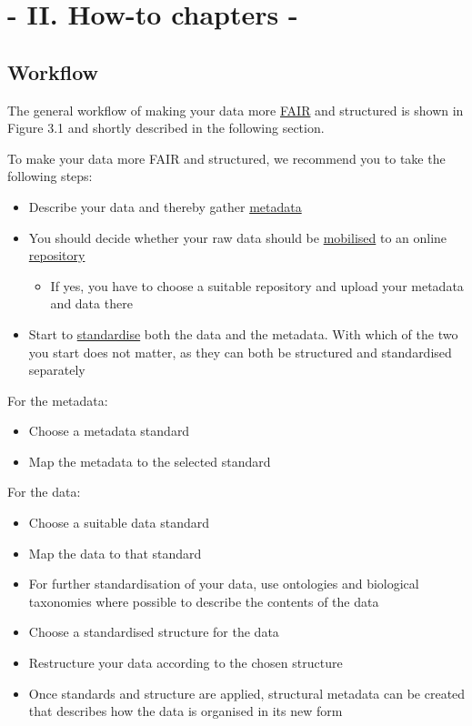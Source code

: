 \documentclass[
  oneside]{book}
\providecommand{\tightlist}{%
  \setlength{\itemsep}{0pt}\setlength{\parskip}{0pt}}
\begin{document}
\part*{- II. How-to chapters -}\label{part---ii.-how-to-chapters--}

\chapter{Workflow}\label{workflow}

The general workflow of making your data more \hyperref[FAIR]{FAIR} and structured is shown in Figure 3.1 and shortly described in the following section.

To make your data more FAIR and structured, we recommend you to take the following steps:

\begin{itemize}
\item
  Describe your data and thereby gather \hyperref[metadata]{metadata}
\item
  You should decide whether your raw data should be \hyperref[mobilisation]{mobilised} to an online \hyperref[repository]{repository}

  \begin{itemize}
  \tightlist
  \item
    If yes, you have to choose a suitable repository and upload your metadata and data there
  \end{itemize}
\item
  Start to \hyperref[standardise]{standardise} both the data and the metadata. With which of the two you start does not matter, as they can both be structured and standardised separately
\end{itemize}

For the metadata:

\begin{itemize}
\item
  Choose a metadata standard
\item
  Map the metadata to the selected standard
\end{itemize}

For the data:

\begin{itemize}
\item
  Choose a suitable data standard
\item
  Map the data to that standard
\item
  For further standardisation of your data, use ontologies and biological taxonomies where possible to describe the contents of the data
\item
  Choose a standardised structure for the data
\item
  Restructure your data according to the chosen structure
\item
  Once standards and structure are applied, structural metadata can be created that describes how the data is organised in its new form
\end{itemize}
\end{document}

